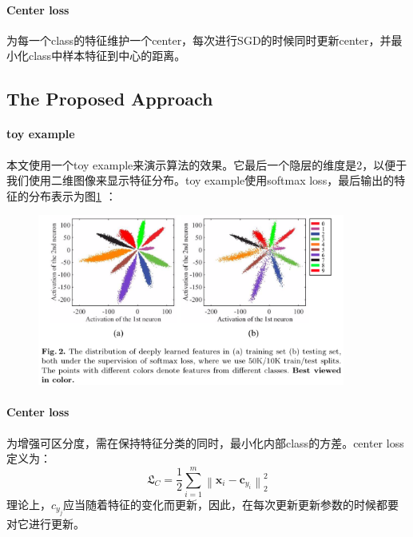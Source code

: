 \documentclass[10pt,letterpaper]{article}
\begin{document}
\paragraph{Center loss} 为每一个class的特征维护一个center，每次进行SGD的时候同时更新center，并最小化class中样本特征到中心的距离。
\subsection{The Proposed Approach}
\paragraph{toy example} 本文使用一个toy example来演示算法的效果。它最后一个隐层的维度是2，以便于我们使用二维图像来显示特征分布。toy example使用softmax loss，最后输出的特征的分布表示为图\ref{softmax-loss-2-d} ：
\begin{figure}[H]
	\centering
	\includegraphics[width=0.9\textwidth]{../images/softmax-loss-2-d.png}
	\caption{}
	\label{softmax-loss-2-d}
\end{figure}

\paragraph{Center loss} 为增强可区分度，需在保持特征分类的同时，最小化内部class的方差。center loss定义为：
\begin{equation}
	\mathfrak{L}_C=\frac{1}{2}\sum^m_{i=1}\left \| \mathbf{x}_i-\mathbf{c}_{y_i} \right \|^2_2
\end{equation}
理论上，$c_{y_j}$应当随着特征的变化而更新，因此，在每次更新更新参数的时候都要对它进行更新。
\end{document}
